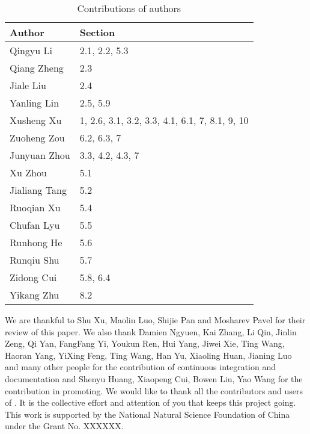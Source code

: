 \documentclass[pra,twocolumn,superscriptaddress,floatfix,nofootinbib,amsmath,amssymb]{revtex4-1}
\numberwithin{equation}{section}
\numberwithin{figure}{section}
\numberwithin{table}{section}
\begin{document}
\begin{table}[ht]
    \begin{tabular}{|p{3cm}|p{3cm}|}
        \toprule
        Author        & Section                                        \\
        \midrule
        Qingyu Li     & 2.1, 2.2, 5.3                                  \\
        Qiang Zheng   & 2.3                                            \\
        Jiale Liu     & 2.4                                            \\
        Yanling Lin   & 2.5, 5.9                                       \\
        Xusheng Xu    & 1, 2.6, 3.1, 3.2, 3.3, 4.1, 6.1, 7, 8.1, 9, 10 \\
        Zuoheng Zou   & 6.2, 6.3, 7                                    \\
        Junyuan Zhou  & 3.3, 4.2, 4.3, 7                               \\
        Xu Zhou       & 5.1                                            \\
        Jialiang Tang & 5.2                                            \\
        Ruoqian Xu    & 5.4                                            \\
        Chufan Lyu    & 5.5                                            \\
        Runhong He    & 5.6                                            \\
        Runqiu Shu    & 5.7                                            \\
        Zidong Cui    & 5.8, 6.4                                       \\
        Yikang Zhu    & 8.2                                            \\
        \bottomrule
    \end{tabular}
    \caption{Contributions of authors}
    \label{tab:contributions}
\end{table}

We are thankful to Shu Xu, Maolin Luo, Shijie Pan and Mosharev Pavel for their review of this paper. We also thank Damien Ngyuen, Kai Zhang, Li Qin, Jinlin Zeng, Qi Yan, FangFang Yi, Youkun Ren, Hui Yang, Jiwei Xie, Ting Wang, Haoran Yang, YiXing Feng, Ting Wang, Han Yu, Xiaoling Huan, Jianing Luo and many other people for the contribution of continuous integration and documentation and Shenyu Huang, Xiaopeng Cui, Bowen Liu, Yao Wang for the contribution in promoting. We would like to thank all the contributors and users of \MindQuantum. It is the collective effort and attention of you that keeps this project going.
This work is supported by the National Natural Science Foundation of China under the Grant No. XXXXXX.

\end{document}
